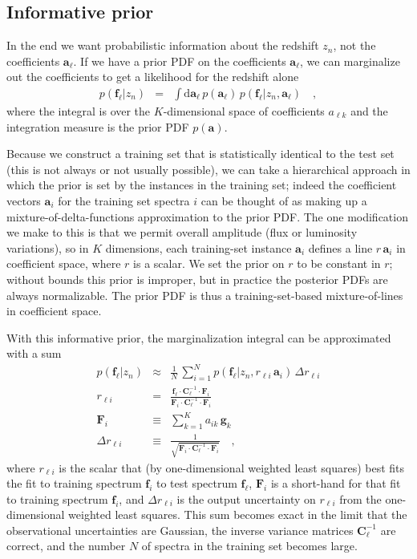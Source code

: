 \documentclass[preprint]{aastex}
\newcommand{\mmatrix}[1]{\boldsymbol{#1}}
\newcommand{\inverse}[1]{{#1}^{-1}}
\newcommand{\covar}{\mmatrix{C}}
\newcommand{\avec}{\mmatrix{a}}
\newcommand{\fvec}{\mmatrix{f}}
\newcommand{\Fvec}{\mmatrix{F}}
\newcommand{\gvec}{\mmatrix{g}}
\newcommand{\invvar}{\inverse{\covar}}
\newcommand{\dd}{\mathrm{d}}
\begin{document}
\subsection{Informative prior}

In the end we want probabilistic information about the redshift $z_n$,
not the coefficients $\avec_\ell$.  If we have a prior PDF on the
coefficients $\avec_\ell$, we can marginalize out the coefficients to
get a likelihood for the redshift alone
\begin{eqnarray}\displaystyle
p(\fvec_\ell|z_n) &=& \int \dd\avec_\ell\,p(\avec_\ell)\,p(\fvec_\ell|z_n,\avec_\ell)
\quad ,
\end{eqnarray}
where the integral is over the $K$-dimensional space of coefficients
$a_{\ell k}$ and the integration measure is the prior PDF $p(\avec)$.

Because we construct a training set that is statistically identical to
the test set (this is not always or not usually possible), we can take
a hierarchical approach in which the prior is set by the instances in
the training set; indeed the coefficient vectors $\avec_i$ for the
training set spectra $i$ can be thought of as making up a
mixture-of-delta-functions approximation to the prior PDF.  The one
modification we make to this is that we permit overall amplitude (flux
or luminosity variations), so in $K$ dimensions, each training-set
instance $\avec_i$ defines a line $r\,\avec_i$ in coefficient space,
where $r$ is a scalar.  We set the prior on $r$ to be constant in $r$;
without bounds this prior is improper, but in practice the posterior
PDFs are always normalizable.  The prior PDF is thus a
training-set-based mixture-of-lines in coefficient space.

With this informative prior, the marginalization integral can be
approximated with a sum
\begin{eqnarray}\displaystyle
p(\fvec_\ell|z_n) &\approx& \frac{1}{N}\,\sum_{i=1}^N p(\fvec_\ell|z_n,r_{\ell i}\,\avec_i)\,\Delta r_{\ell i} \nonumber\\
r_{\ell i} &=& \frac{\fvec_\ell\cdot\invvar_\ell\cdot\Fvec_i}{\Fvec_i\cdot\invvar_\ell\cdot\Fvec_i} \nonumber\\
\Fvec_i &\equiv& \sum_{k=1}^K a_{ik}\,\gvec_k \nonumber\\
\Delta r_{\ell i} &\equiv& \frac{1}{\sqrt{\Fvec_i\cdot\invvar_\ell\cdot\Fvec_i}}
\quad ,
\end{eqnarray}
where $r_{\ell i}$ is the scalar that (by one-dimensional weighted
least squares) best fits the fit to training spectrum $\fvec_i$ to
test spectrum $\fvec_\ell$, $\Fvec_i$ is a short-hand for that fit to
training spectrum $\fvec_i$, and $\Delta r_{\ell i}$ is the output
uncertainty on $r_{\ell i}$ from the one-dimensional weighted least
squares.  This sum becomes exact in the limit that the observational
uncertainties are Gaussian, the inverse variance matrices
$\invvar_\ell$ are correct, and the number $N$ of spectra in the
training set becomes large.
\end{document}
